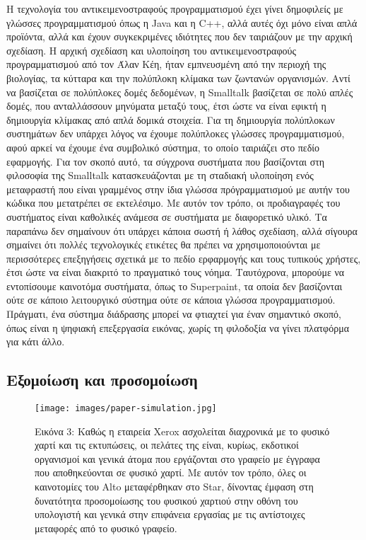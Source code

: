 \documentclass[
]{article}
\begin{document}
Η τεχνολογία του αντικειμενοστραφούς προγραμματισμού έχει γίνει
δημοφιλείς με γλώσσες προγραμματισμού όπως η Java και η C++, αλλά αυτές
όχι μόνο είναι απλά προϊόντα, αλλά και έχουν συγκεκριμένες ιδιότητες που
δεν ταιριάζουν με την αρχική σχεδίαση. Η αρχική σχεδίαση και υλοποίηση
του αντικειμενοστραφούς προγραμματισμού από τον Άλαν Κέη, ήταν
εμπνευσμένη από την περιοχή της βιολογίας, τα κύτταρα και την πολύπλοκη
κλίμακα των ζωντανών οργανισμών. Αντί να βασίζεται σε πολύπλοκες δομές
δεδομένων, η Smalltalk βασίζεται σε πολύ απλές δομές, που ανταλλάσσουν
μηνύματα μεταξύ τους, έτσι ώστε να είναι εφικτή η δημιουργία κλίμακας
από απλά δομικά στοιχεία. Για τη δημιουργία πολύπλοκων συστημάτων δεν
υπάρχει λόγος να έχουμε πολύπλοκες γλώσσες προγραμματισμού, αφού αρκεί
να έχουμε ένα συμβολικό σύστημα, το οποίο ταιριάζει στο πεδίο εφαρμογής.
Για τον σκοπό αυτό, τα σύγχρονα συστήματα που βασίζονται στη φιλοσοφία
της Smalltalk κατασκευάζονται με τη σταδιακή υλοποίηση ενός μεταφραστή
που είναι γραμμένος στην ίδια γλώσσα πρόγραμματισμού με αυτήν του κώδικα
που μετατρέπει σε εκτελέσιμο. Με αυτόν τον τρόπο, οι προδιαγραφές του
συστήματος είναι καθολικές ανάμεσα σε συστήματα με διαφορετικό υλικό. Τα
παραπάνω δεν σημαίνουν ότι υπάρχει κάποια σωστή ή λάθος σχεδίαση, αλλά
σίγουρα σημαίνει ότι πολλές τεχνολογικές ετικέτες θα πρέπει να
χρησιμοποιούνται με περισσότερες επεξηγήσεις σχετικά με το πεδίο
ερφαρμογής και τους τυπικούς χρήστες, έτσι ώστε να είναι διακριτό το
πραγματικό τους νόημα. Ταυτόχρονα, μπορούμε να εντοπίσουμε καινοτόμα
συστήματα, όπως το Superpaint, τα οποία δεν βασίζονται ούτε σε κάποιο
λειτουργικό σύστημα ούτε σε κάποια γλώσσα προγραμματισμού. Πράγματι, ένα
σύστημα διάδρασης μπορεί να φτιαχτεί για έναν σημαντικό σκοπό, όπως
είναι η ψηφιακή επεξεργασία εικόνας, χωρίς τη φιλοδοξία να γίνει
πλατφόρμα για κάτι άλλο.

\hypertarget{ux3b5ux3beux3bfux3bcux3bfux3afux3c9ux3c3ux3b7-ux3baux3b1ux3b9-ux3c0ux3c1ux3bfux3c3ux3bfux3bcux3bfux3afux3c9ux3c3ux3b7}{%
\subsection{Εξομοίωση και
προσομοίωση}\label{ux3b5ux3beux3bfux3bcux3bfux3afux3c9ux3c3ux3b7-ux3baux3b1ux3b9-ux3c0ux3c1ux3bfux3c3ux3bfux3bcux3bfux3afux3c9ux3c3ux3b7}}

\leavevmode{}%
\begin{figure}
\hypertarget{fig:paper-simulation}{%
\centering
\texttt{[image: images/paper-simulation.jpg]}
\caption{Εικόνα 3: Καθώς η εταιρεία Xerox ασχολείται διαχρονικά με το
φυσικό χαρτί και τις εκτυπώσεις, οι πελάτες της είναι, κυρίως, εκδοτικοί
οργανισμοί και γενικά άτομα που εργάζονται στο γραφείο με έγγραφα που
αποθηκεύονται σε φυσικό χαρτί. Με αυτόν τον τρόπο, όλες οι καινοτομίες
του Alto μεταφέρθηκαν στο Star, δίνοντας έμφαση στη δυνατότητα
προσομοίωσης του φυσικού χαρτιού στην οθόνη του υπολογιστή και γενικά
στην επιφάνεια εργασίας με τις αντίστοιχες μεταφορές από το φυσικό
γραφείο.}\label{fig:paper-simulation}
}
\end{figure}
\end{document}
